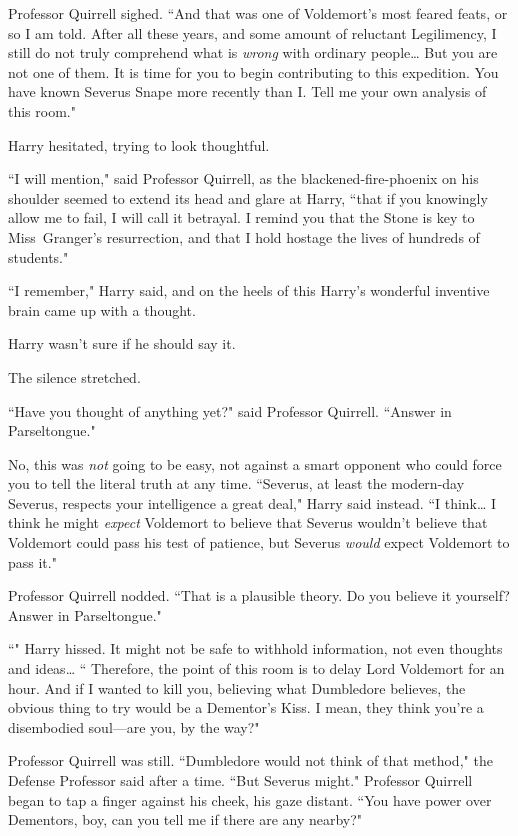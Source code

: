Professor Quirrell sighed. ``And that was one of Voldemort's most feared feats, or so I am told. After all these years, and some amount of reluctant Legilimency, I still do not truly comprehend what is \emph{wrong} with ordinary people{\ldots} But you are not one of them. It is time for you to begin contributing to this expedition. You have known Severus Snape more recently than I\@. Tell me your own analysis of this room."

Harry hesitated, trying to look thoughtful.

``I will mention," said Professor Quirrell, as the blackened-fire-phoenix on his shoulder seemed to extend its head and glare at Harry, ``that if you knowingly allow me to fail, I will call it betrayal. I remind you that the Stone is key to Miss~Granger's resurrection, and that I hold hostage the lives of hundreds of students."

``I remember," Harry said, and on the heels of this Harry's wonderful inventive brain came up with a thought.

Harry wasn't sure if he should say it.

The silence stretched.

``Have you thought of anything yet?" said Professor Quirrell. ``Answer in Parseltongue."

No, this was \emph{not} going to be easy, not against a smart opponent who could force you to tell the literal truth at any time. ``Severus, at least the modern-day Severus, respects your intelligence a great deal," Harry said instead. ``I think{\ldots} I think he might \emph{expect} Voldemort to believe that Severus wouldn't believe that Voldemort could pass his test of patience, but Severus \emph{would} expect Voldemort to pass it."

Professor Quirrell nodded. ``That is a plausible theory. Do you believe it yourself? Answer in Parseltongue."

``" Harry hissed. It might not be safe to withhold information, not even thoughts and ideas{\ldots} `` Therefore, the point of this room is to delay Lord Voldemort for an hour. And if I wanted to kill you, believing what Dumbledore believes, the obvious thing to try would be a Dementor's Kiss. I mean, they think you're a disembodied soul---are you, by the way?"

Professor Quirrell was still. ``Dumbledore would not think of that method," the Defense Professor said after a time. ``But Severus might." Professor Quirrell began to tap a finger against his cheek, his gaze distant. ``You have power over Dementors, boy, can you tell me if there are any nearby?"

